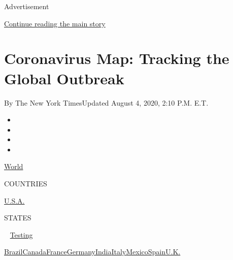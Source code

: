 Advertisement

\protect\hyperlink{after-top}{Continue reading the main story}

\hypertarget{coronavirus-map-tracking-the-global-outbreak}{%
\section{Coronavirus Map: Tracking the Global
Outbreak}\label{coronavirus-map-tracking-the-global-outbreak}}

By The New York TimesUpdated August 4, 2020, 2:10 P.M. E.T.

\begin{itemize}
\item
\item
\item
\item
\end{itemize}

\href{https://www.nytimes3xbfgragh.onion/interactive/2020/world/coronavirus-maps.html}{World}~

COUNTRIES

\textbar{}
\href{https://www.nytimes3xbfgragh.onion/interactive/2020/us/coronavirus-us-cases.html}{U.S.A.}~

STATES

~
\href{https://www.nytimes3xbfgragh.onion/interactive/2020/us/coronavirus-testing.html}{Testing}

\href{https://www.nytimes3xbfgragh.onion/interactive/2020/world/americas/brazil-coronavirus-cases.html}{Brazil}\href{https://www.nytimes3xbfgragh.onion/interactive/2020/world/canada/canada-coronavirus-cases.html}{Canada}\href{https://www.nytimes3xbfgragh.onion/interactive/2020/world/europe/france-coronavirus-cases.html}{France}\href{https://www.nytimes3xbfgragh.onion/interactive/2020/world/europe/germany-coronavirus-cases.html}{Germany}\href{https://www.nytimes3xbfgragh.onion/interactive/2020/world/asia/india-coronavirus-cases.html}{India}\href{https://www.nytimes3xbfgragh.onion/interactive/2020/world/europe/italy-coronavirus-cases.html}{Italy}\href{https://www.nytimes3xbfgragh.onion/interactive/2020/world/americas/mexico-coronavirus-cases.html}{Mexico}\href{https://www.nytimes3xbfgragh.onion/interactive/2020/world/europe/spain-coronavirus-cases.html}{Spain}\href{https://www.nytimes3xbfgragh.onion/interactive/2020/world/europe/united-kingdom-coronavirus-cases.html}{U.K.}

